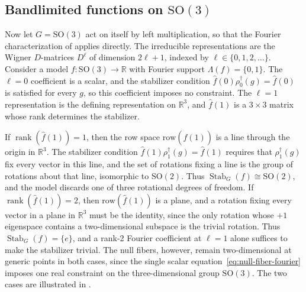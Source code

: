 \documentclass[11pt]{article}
\DeclareMathOperator{\rank}{rank}
\DeclareMathOperator{\Stab}{Stab}
\newcommand{\RR}{\mathbb{R}}
\newcommand{\fhat}{\hat{f}}
\begin{document}
\subsection{Bandlimited functions on $\mathrm{SO}(3)$}\label{ex:so3}

Now let $G = \mathrm{SO}(3)$ act on itself by left multiplication, so that the Fourier characterization of  applies directly. The irreducible representations are the Wigner $D$-matrices $D^\ell$ of dimension $2\ell + 1$, indexed by $\ell \in \{0, 1, 2, \ldots\}$. Consider a model $f\colon \mathrm{SO}(3) \to \RR$ with Fourier support $\Lambda(f) = \{0, 1\}$. The $\ell = 0$ coefficient is a scalar, and the stabilizer condition $\fhat(0)\rho_0^\dagger(g) = \fhat(0)$ is satisfied for every $g$, so this coefficient imposes no constraint. The $\ell = 1$ representation is the defining representation on $\RR^3$, and $\fhat(1)$ is a $3 \times 3$ matrix whose rank determines the stabilizer.

If $\rank(\fhat(1)) = 1$, then the row space $\mathrm{row}(\fhat(1))$ is a line through the origin in $\RR^3$. The stabilizer condition $\fhat(1)\rho_1^\dagger(g) = \fhat(1)$ requires that $\rho_1^\dagger(g)$ fix every vector in this line, and the set of rotations fixing a line is the group of rotations about that line, isomorphic to $\mathrm{SO}(2)$. Thus $\Stab_G(f) \cong \mathrm{SO}(2)$, and the model discards one of three rotational degrees of freedom. If $\rank(\fhat(1)) = 2$, then $\mathrm{row}(\fhat(1))$ is a plane, and a rotation fixing every vector in a plane in $\RR^3$ must be the identity, since the only rotation whose $+1$ eigenspace contains a two-dimensional subspace is the trivial rotation. Thus $\Stab_G(f) = \{e\}$, and a rank-2 Fourier coefficient at $\ell = 1$ alone suffices to make the stabilizer trivial. The null fibers, however, remain two-dimensional at generic points in both cases, since the single scalar equation~\eqref{eq:null-fiber-fourier} imposes one real constraint on the three-dimensional group $\mathrm{SO}(3)$. The two cases are illustrated in .
\end{document}
